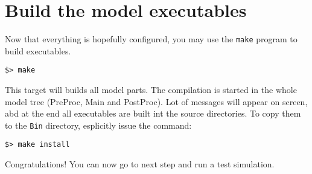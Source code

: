 \section{Build the model executables}

Now that everything is hopefully configured, you may use the \verb=make=
program to build executables.

\begin{Verbatim}
$> make
\end{Verbatim}

This target will builds all model parts. 
The compilation is started in the whole model tree (PreProc, Main and PostProc).
Lot of messages will appear on screen, abd at the end all executables are built
int the source directories.
To copy them to the \verb=Bin= directory, esplicitly issue the command:

\begin{Verbatim}
$> make install
\end{Verbatim}

Congratulations! You can now go to next step and run a test simulation.
